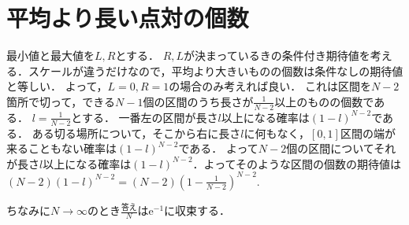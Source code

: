 \section{平均より長い点対の個数}
最小値と最大値を$L,R$とする．
$R,L$が決まっているきの条件付き期待値を考える．スケールが違うだけなので，平均より大きいものの個数は条件なしの期待値と等しい．
よって，$L=0,R=1$の場合のみ考えれば良い．
これは区間を$N-2$箇所で切って，できる$N-1$個の区間のうち長さが$\frac{1}{N-2}$以上のものの個数である．
$l = \frac{1}{N-2}$とする．
一番左の区間が長さ$l$以上になる確率は$(1-l)^{N-2}$である．
ある切る場所について，そこから右に長さ$l$に何もなく，$[0,1]$区間の端が来ることもない確率は$(1-l)^{N-2}$である．
よって$N-2$個の区間についてそれが長さ$l$以上になる確率は$(1-l)^{N-2}$．よってそのような区間の個数の期待値は
$(N-2)(1-l)^{N-2} = (N-2)(1-\frac{1}{N-2})^{N-2}$.

ちなみに$N \to \infty$のとき$\frac{\mathrm{答え}}{N}$は$\mathrm{e}^{-1}$に収束する．
